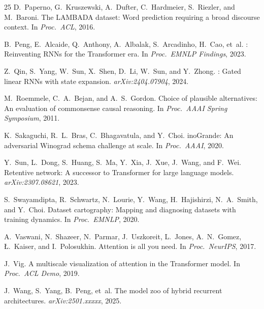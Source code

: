\documentclass[11pt,twocolumn]{article}
\begin{document}
\begin{thebibliography}{25}
D.~Paperno, G.~Kruszewski, A.~Dufter, C.~Hardmeier, S.~Riezler, and M.~Baroni.
\newblock The {LAMBADA} dataset: Word prediction requiring a broad discourse context.
\newblock In \emph{Proc.\ ACL}, 2016.

B.~Peng, E.~Alcaide, Q.~Anthony, A.~Albalak, S.~Arcadinho, H.~Cao, et~al.
: Reinventing {RNN}s for the {T}ransformer era.
\newblock In \emph{Proc.\ EMNLP Findings}, 2023.

Z.~Qin, S.~Yang, W.~Sun, X.~Shen, D.~Li, W.~Sun, and Y.~Zhong.
: Gated linear {RNN}s with state expansion.
\newblock \emph{arXiv:2404.07904}, 2024.

M.~Roemmele, C.~A.~Bejan, and A.~S.~Gordon.
\newblock Choice of plausible alternatives: An evaluation of commonsense causal reasoning.
\newblock In \emph{Proc.\ AAAI Spring Symposium}, 2011.

K.~Sakaguchi, R.~L.~Bras, C.~Bhagavatula, and Y.~Choi.
ino{G}rande: An adversarial {W}inograd schema challenge at scale.
\newblock In \emph{Proc.\ AAAI}, 2020.

Y.~Sun, L.~Dong, S.~Huang, S.~Ma, Y.~Xia, J.~Xue, J.~Wang, and F.~Wei.
\newblock Retentive network: A successor to {T}ransformer for large language models.
\newblock \emph{arXiv:2307.08621}, 2023.

S.~Swayamdipta, R.~Schwartz, N.~Lourie, Y.~Wang, H.~Hajishirzi, N.~A.~Smith, and Y.~Choi.
\newblock Dataset cartography: Mapping and diagnosing datasets with training dynamics.
\newblock In \emph{Proc.\ EMNLP}, 2020.

A.~Vaswani, N.~Shazeer, N.~Parmar, J.~Uszkoreit, L.~Jones, A.~N.~Gomez, {\L}.~Kaiser, and I.~Polosukhin.
\newblock Attention is all you need.
\newblock In \emph{Proc.\ NeurIPS}, 2017.

J.~Vig.
\newblock A multiscale visualization of attention in the {T}ransformer model.
\newblock In \emph{Proc.\ ACL Demo}, 2019.

J.~Wang, S.~Yang, B.~Peng, et~al.
\newblock The model zoo of hybrid recurrent architectures.
\newblock \emph{arXiv:2501.xxxxx}, 2025.


\end{thebibliography}
\end{document}
